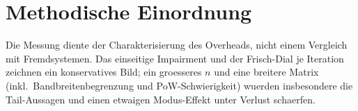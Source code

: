 \section{Methodische Einordnung}
\label{sec:disk-methodik}

Die Messung diente der Charakterisierung des Overheads, nicht einem Vergleich
mit Fremdsystemen. Das einseitige Impairment und der Frisch-Dial je Iteration
zeichnen ein konservatives Bild; ein groesseres $n$ und eine breitere Matrix
(inkl.\ Bandbreitenbegrenzung und PoW-Schwierigkeit) wuerden insbesondere die
Tail-Aussagen und einen etwaigen Modus-Effekt unter Verlust schaerfen.
